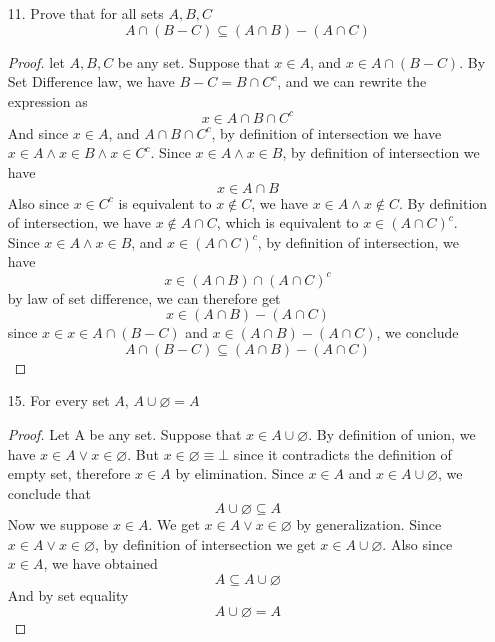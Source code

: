 \documentclass[12pt]{article}
\newcommand{\paren}[1]{\left( #1 \right)}
\begin{document}
\begin{enumerate}
        \item[11.] Prove that for all sets $A,B,C$
            \[
            A \cap \paren{B - C}\subseteq \paren{A \cap B }- \paren{A \cap C}
            \]
            \begin{proof}
                let $A,B,C$ be any set. Suppose that $x \in A$, and $x \in A \cap \paren{B-C}$. By Set Difference law, we have $B - C = B \cap C^c$, and we can rewrite the expression as
                    \[
                    x\in A \cap B \cap C^c
                    \]
                And since $x \in A$, and $A \cap B \cap C^c$, by definition of intersection we have $ x \in A \wedge x \in B \wedge x \in C^c$. Since $x \in A \wedge x \in B$, by definition of intersection we have 
                \[
                x\in A \cap B
                \]
                Also since $x \in C^c $ is equivalent to $x \notin C $, we have $x \in A \wedge x \notin C$. By definition of intersection, we have $x \notin A \cap C$, which is equivalent to $ x \in \paren{A \cap C}^c$. Since $x \in A \wedge x \in B$, and $ x \in \paren{A \cap C}^c$, by definition of intersection, we have 
                \[
                x \in \paren{A \cap B }\cap \paren{A \cap C}^c
                \]
                by law of set difference, we can therefore get
                \[
                x \in \paren{A \cap B } - \paren{A \cap C}
                \]
                since $x \in x \in A \cap \paren{B-C}$ and $x \in \paren{A \cap B } - \paren{A \cap C}$, we conclude
                \[
                A \cap \paren{B - C}\subseteq \paren{A \cap B }- \paren{A \cap C}
                \]
            \end{proof}

        \item[15.] For every set $A$, $A \cup \varnothing = A$
            \begin{proof}
                Let A be any set. Suppose that $x \in A \cup \varnothing.$ By definition of union, we have $x \in A \vee x \in \varnothing$. But $x \in \varnothing \equiv \bot$ since it contradicts the definition of empty set, therefore $x \in A$ by elimination. Since  $x \in A$ and $x \in A \cup \varnothing$, we conclude that 
                \[
                A \cup \varnothing \subseteq A
                \]
                Now we suppose $x \in A$. We get $x \in A \vee x \in \varnothing$ by generalization. Since $x \in A \vee x \in \varnothing$, by definition of intersection we get $x \in A \cup \varnothing$. Also since $x \in A$, we have obtained 
                \[
                A \subseteq A \cup \varnothing
                \]
                And by set equality
                \[
                A \cup \varnothing = A
                \]
            \end{proof}
    \newpage


\end{enumerate}
\end{document}
